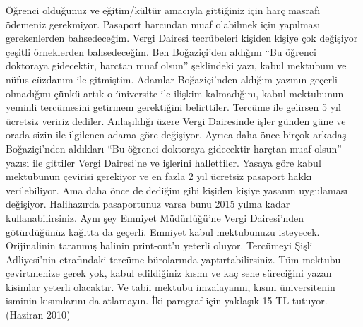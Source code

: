 \documentclass[12pt,a4paper]{article}
\begin{document}
Öğrenci olduğunuz ve eğitim/kültür amacıyla gittiğiniz için harç masrafı ödemeniz gerekmiyor. Pasaport harcından muaf olabilmek için yapılması gerekenlerden bahsedeceğim. Vergi Dairesi tecrübeleri kişiden kişiye çok değişiyor çeşitli örneklerden bahsedeceğim. Ben Boğaziçi'den aldığım ``Bu öğrenci doktoraya gidecektir, harctan muaf olsun'' şeklindeki yazı, kabul mektubum ve nüfus cüzdanım ile gitmiştim. Adamlar Boğaziçi'nden aldığım yazının geçerli olmadığını çünkü artık o üniversite ile ilişkim kalmadığını, kabul mektubunun yeminli tercümesini getirmem gerektiğini belirttiler. Tercüme ile gelirsen 5 yıl ücretsiz veririz dediler. Anlaşıldığı üzere Vergi Dairesi\-nde işler günden güne ve orada sizin ile ilgilenen adama göre değişiyor. Ayrıca daha önce birçok arkadaş Boğaziçi'nden aldıkları ``Bu öğrenci doktoraya gidecektir harçtan muaf olsun'' yazısı ile gittiler Vergi Dairesi'ne ve işlerini hallettiler. Yasaya göre kabul mektubunun çevirisi gerekiyor ve en fazla 2 yıl ücretsiz pasaport hakkı verilebiliyor. Ama daha önce de dediğim gibi kişiden kişiye yasanın uygulaması değişiyor.  Halihazırda pasaportunuz varsa bunu 2015 yılına kadar kullanabilirsiniz. Aynı şey Emniyet Müdürlüğü'ne Vergi Dairesi'nden götürdüğünüz kağıtta da geçerli. Emniyet kabul mektubunuzu isteyecek. Orijinalinin taranmış halinin print-out'u yeterli oluyor. Tercümeyi Şişli Adliyesi'nin etrafındaki tercüme bürolarında yaptırtabilirsiniz. Tüm mektubu çevirtmenize gerek yok, kabul edildiğiniz kısmı ve kaç sene süreciğini yazan kisimlar yeterli olacaktır. Ve tabii mektubu imzalayanın, kısım üniversitenin isminin kısımlarını da atlamayın. İki paragraf için yaklaşık 15 TL tutuyor. (Haziran 2010) 
\end{document}
